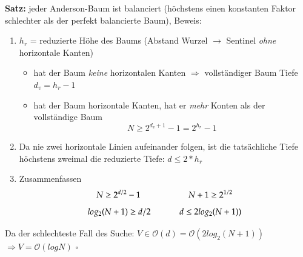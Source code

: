 \documentclass[11pt, fleqn]{scrreprt}
\begin{document}
\textbf{Satz:} jeder Anderson-Baum ist balanciert (höchstens einen konstanten Faktor schlechter als der perfekt balancierte Baum), Beweis:
\begin{enumerate}
	\item $h_r$ = reduzierte Höhe des Baums (Abstand Wurzel $\rightarrow$ Sentinel \emph{ohne} horizontale Kanten)
	\begin{itemize}
		\item hat der Baum \emph{keine} horizontalen Kanten $\Rightarrow$ vollständiger Baum Tiefe $d_v = h_r - 1$
		\item hat der Baum horizontale Kanten, hat er \emph{mehr} Konten als der vollständige Baum
		\[ N \geq 2^{d_v +1} - 1 = 2^{h_r}-1\]
	\end{itemize}
	\item Da nie zwei horizontale Linien aufeinander folgen, ist die tatsächliche Tiefe höchstens zweimal die reduzierte Tiefe: $d \leq 2 * h_r$
	\item Zusammenfassen
	\[ N \geq 2^{d/2} - 1 \hspace*{2cm} N+1 \geq 2^{1/2} \]
	\[ log_2(N+1) \geq d/2 \hspace*{1.2cm} d \leq 2 log_2(N+1)) \]
\end{enumerate}
Da der schlechteste Fall des Suche: $V \in \mathcal{O}(d) = \mathcal{O}(2 log_2(N+1))$\\
\hspace*{6.45cm} $\Rightarrow \boxed{V = \mathcal{O}(log N)}$ \hspace*{5cm} $\square$ \\
\end{document}
